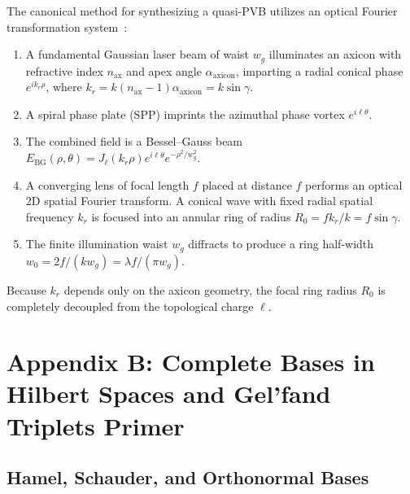 \documentclass{optica-article}
\begin{document}
The canonical method for synthesizing a quasi-PVB utilizes an optical Fourier transformation system~\cite{Vaity2015}:
\begin{enumerate}
    \item A fundamental Gaussian laser beam of waist $w_g$ illuminates an axicon with refractive index $n_{\text{ax}}$ and apex angle $\alpha_{\text{axicon}}$, imparting a radial conical phase $e^{i k_r \rho}$, where $k_r = k (n_{\text{ax}}-1) \alpha_{\text{axicon}} = k \sin \gamma$.
    \item A spiral phase plate (SPP) imprints the azimuthal phase vortex $e^{i \ell \theta}$.
    \item The combined field is a Bessel--Gauss beam $E_{\text{BG}}(\rho, \theta) = J_\ell(k_r \rho) e^{i \ell \theta} e^{-\rho^2 / w_g^2}$.
    \item A converging lens of focal length $f$ placed at distance $f$ performs an optical 2D spatial Fourier transform. A conical wave with fixed radial spatial frequency $k_r$ is focused into an annular ring of radius $R_0 = f k_r / k = f \sin \gamma$.
    \item The finite illumination waist $w_g$ diffracts to produce a ring half-width $w_0 = 2f / (k w_g) = \lambda f / (\pi w_g)$.
\end{enumerate}

Because $k_r$ depends only on the axicon geometry, the focal ring radius $R_0$ is completely decoupled from the topological charge $\ell$.

\section{Appendix B: Complete Bases in Hilbert Spaces and Gel'fand Triplets Primer}
\label{app:hilbert}

\subsection{Hamel, Schauder, and Orthonormal Bases}
\end{document}
